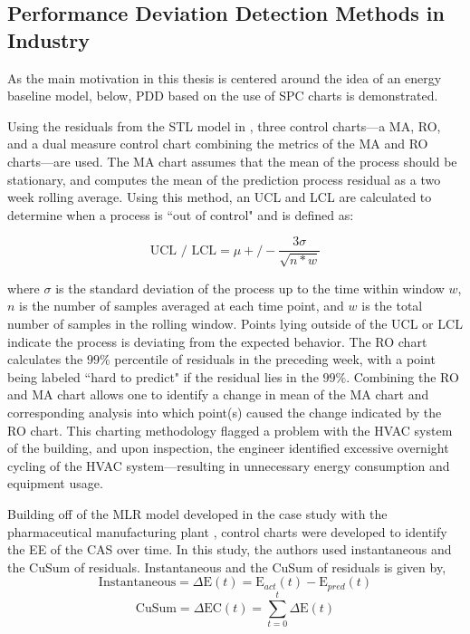\subsection{Performance Deviation Detection Methods in Industry}

As the main motivation in this thesis is centered around the idea of an energy baseline model, below, PDD based on the use of SPC charts is demonstrated.

Using the residuals from the STL model in \cite{tightening}, three control charts—a \ac{MA}, \ac{RO}, and a dual measure control chart combining the metrics of the MA and RO charts—are used. The MA chart assumes that the mean of the process should be stationary, and computes the mean of the prediction process residual as a two week rolling average. Using this method, an \ac{UCL} and \ac{LCL} are calculated to determine when a process is ``out of control" and is defined as:

\begin{equation}
    \text{UCL / LCL} = \mu +/- \frac{3\sigma}{\sqrt{n * w}}
\end{equation}

where $\sigma$ is the standard deviation of the process up to the time within window $w$, $n$ is the number of samples averaged at each time point, and $w$ is the total number of samples in the rolling window. Points lying outside of the UCL or LCL indicate the process is deviating from the expected behavior. The RO chart calculates the $99\%$ percentile of residuals in the preceding week, with a point being labeled ``hard to predict" if the residual lies in the $99\%$. Combining the RO and MA chart allows one to identify a change in mean of the MA chart and corresponding analysis into which point(s) caused the change indicated by the RO chart. This charting methodology flagged a problem with the HVAC system of the building, and upon inspection, the engineer identified excessive overnight cycling of the HVAC system—resulting in unnecessary energy consumption and equipment usage. 

Building off of the MLR model developed in the case study with the pharmaceutical manufacturing plant \cite{cas}, control charts were developed to identify the EE of the CAS over time. In this study, the authors used instantaneous and the \ac{CuSum} of residuals. Instantaneous and the CuSum of residuals is given by,
\begin{equation}
    \text{Instantaneous} = \Delta \text{E}(t) = \text{E}_{act}(t) - \text{E}_{pred}(t)
\end{equation}
\begin{equation}
    \text{CuSum} = \Delta \text{EC}(t) = \sum_{t=0}^t\Delta \text{E}(t)
\end{equation}

